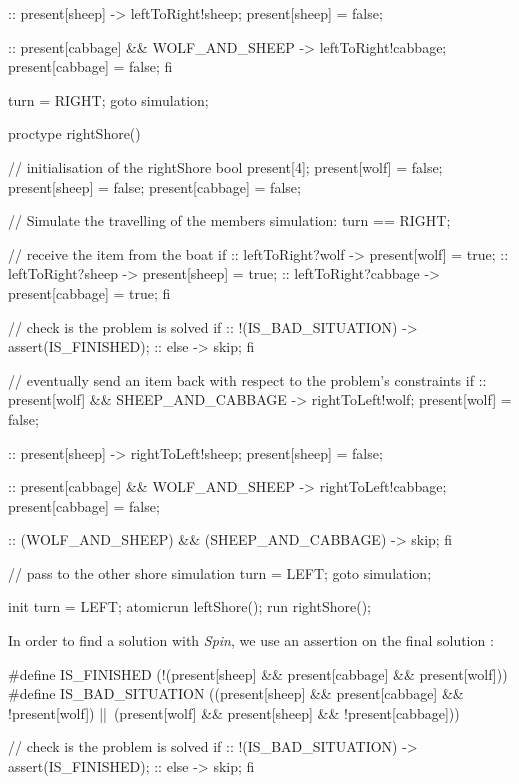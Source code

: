 \documentclass[a4paper,11pt]{report}
\begin{document}
\begin{promelacode}
{        :: present[sheep] -> leftToRight!sheep; present[sheep] = false;

        :: present[cabbage] && WOLF_AND_SHEEP -> leftToRight!cabbage; present[cabbage] = false;
    fi

    turn = RIGHT;
    goto simulation;
}

proctype rightShore() {
    // initialisation of the rightShore
    bool present[4];
    present[wolf] = false;
    present[sheep] = false;
    present[cabbage] = false;

    // Simulate the travelling of the members
    simulation:
    turn == RIGHT;

    // receive the item from the boat
    if
        :: leftToRight?wolf -> present[wolf] = true;
        :: leftToRight?sheep -> present[sheep] = true;
        :: leftToRight?cabbage -> present[cabbage] = true;
    fi

    // check is the problem is solved
    if
        :: !(IS_BAD_SITUATION) -> assert(IS_FINISHED);
        :: else -> skip;
    fi

    // eventually send an item back with respect to the problem's constraints
    if
        :: present[wolf] && SHEEP_AND_CABBAGE
        -> rightToLeft!wolf; present[wolf] = false;

        :: present[sheep]
        -> rightToLeft!sheep; present[sheep] = false;

        :: present[cabbage] && WOLF_AND_SHEEP
        -> rightToLeft!cabbage; present[cabbage] = false;

        :: (WOLF_AND_SHEEP) && (SHEEP_AND_CABBAGE)
        -> skip;
    fi

    // pass to the other shore simulation
    turn = LEFT;
    goto simulation;
}

init {
    turn = LEFT; atomic{run leftShore(); run rightShore()};
}
\end{promelacode}

In order to find a solution with \textit{Spin}, we use an assertion on the final
solution :

\begin{promelacode}
#define IS_FINISHED (!(present[sheep] && present[cabbage] && present[wolf]))
#define IS_BAD_SITUATION ((present[sheep] && present[cabbage] && !present[wolf]) ||\
(present[wolf] && present[sheep] && !present[cabbage]))

// check is the problem is solved
if
:: !(IS_BAD_SITUATION) -> assert(IS_FINISHED);
:: else -> skip;
fi
\end{promelacode}
\end{document}
